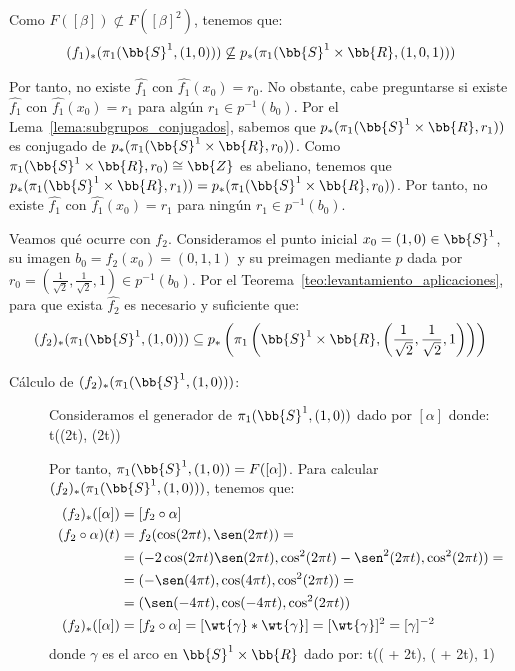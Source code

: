 \begin{ejemplo}
\begin{description}
        Como $F([\beta]) \not\subset F([\beta]^2)$, tenemos que:
        \begin{gather*}
            (f_1)_*(\pi_1(\bb{S}^1,(1,0))) \not\subseteq p_*(\pi_1(\bb{S}^1\times \bb{R},(1,0,1)))
        \end{gather*}

        Por tanto, no existe $\hat{f_1}$ con $\hat{f_1}(x_0)=r_0$. No obstante, cabe preguntarse si existe $\hat{f_1}$ con $\hat{f_1}(x_0)=r_1$ para algún $r_1\in p^{-1}(b_0)$. Por el Lema~\ref{lema:subgrupos_conjugados}, sabemos que $p_*(\pi_1(\bb{S}^1\times \bb{R},r_1))$ es conjugado de $p_*(\pi_1(\bb{S}^1\times \bb{R},r_0))$. Como $\pi_1(\bb{S}^1\times \bb{R},r_0)\cong \bb{Z}$ es abeliano, tenemos que $p_*(\pi_1(\bb{S}^1\times \bb{R},r_1)) = p_*(\pi_1(\bb{S}^1\times \bb{R},r_0))$. Por tanto, no existe $\hat{f_1}$ con $\hat{f_1}(x_0)=r_1$ para ningún $r_1\in p^{-1}(b_0)$.    

        \item[Levantamiento de $f_2$.] Veamos qué ocurre con $f_2$. Consideramos el punto inicial $x_0=(1,0)\in \bb{S}^1$, su imagen $b_0=f_2(x_0)=(0,1,1)$ y su preimagen mediante $p$ dada por $r_0=\left(\frac{1}{\sqrt{2}}, \frac{1}{\sqrt{2}}, 1\right)\in p^{-1}(b_0)$. Por el Teorema~\ref{teo:levantamiento_aplicaciones}, para que exista $\hat{f_2}$ es necesario y suficiente que:
        \begin{equation*}
            (f_2)_*(\pi_1(\bb{S}^1,(1,0))) \subseteq p_*\left(\pi_1\left(\bb{S}^1\times \bb{R},\left(\frac{1}{\sqrt{2}}, \frac{1}{\sqrt{2}}, 1\right)\right)\right)
        \end{equation*}
        \begin{description}
            \item[Cálculo de $(f_2)_*(\pi_1(\bb{S}^1,(1,0)))$:] Consideramos el generador de $\pi_1(\bb{S}^1,(1,0))$ dado por $[\alpha]$ donde:
                {t}{(\cos(2\pi t), \sen(2\pi t))}
            
            Por tanto, $\pi_1(\bb{S}^1,(1,0))=F([\alpha])$. Para calcular $(f_2)_*(\pi_1(\bb{S}^1,(1,0)))$, tenemos que:
            \begin{align*}
                (f_2)_*([\alpha]) &= [f_2 \circ \alpha]\\
                (f_2\circ \alpha)(t) &= f_2(\cos(2\pi t), \sen(2\pi t)) =\\&= (-2\cos(2\pi t)\sen(2\pi t), \cos^2(2\pi t) - \sen^2(2\pi t), \cos^2(2\pi t))
                =\\&= (-\sen(4\pi t), \cos(4\pi t), \cos^2(2\pi t)) =\\&= (\sen(-4\pi t), \cos(-4\pi t), \cos^2(2\pi t))\\
                (f_2)_*([\alpha]) &= [f_2\circ \alpha] = [\wt{\gamma} \ast \wt{\gamma}] = [\wt{\gamma}]^{2} = [\gamma]^{-2}
            \end{align*}
            donde $\gamma$ es el arco en $\bb{S}^1\times \bb{R}$ dado por:
                {t}{\left(\cos\left( + 2\pi t\right), \sen\left( + 2\pi t\right), 1\right)}


\end{description}
\end{description}
\end{ejemplo}
